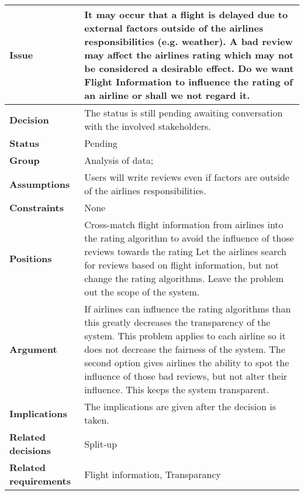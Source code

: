 
\label{dd:flight-inf}
\begin{tabular}{ l  p{10cm}}
\hline
\bf Issue & It may occur that a flight is delayed due to external factors outside of the airlines responsibilities (e.g. weather). A bad review may affect the airlines rating which may not be considered a desirable effect. Do we want Flight Information to influence the rating of an airline or shall we not regard it. \\
\hline
\bf Decision & The status is still pending awaiting conversation with the involved stakeholders. \\
\hline
\bf Status & Pending \\
\hline
\bf Group & Analysis of data; \\
\hline
\bf Assumptions & Users will write reviews even if factors are outside of the airlines responsibilities. \\
\hline
\bf Constraints & None \\
\hline
\bf Positions & Cross-match flight information from airlines into the rating algorithm to avoid the influence of those reviews towards the rating \newline\newline
Let the airlines search for reviews based on flight information, but not change the rating algorithms. \newline\newline
Leave the problem out the scope of the system. \\
\hline
\bf Argument & If airlines can influence the rating algorithms than this greatly decreases the transparency of the system. This problem applies to each airline so it does not decrease the fairness of the system. The second option gives airlines the ability to spot the influence of those bad reviews, but not alter their influence. This keeps the system transparent. \\
\hline
\bf Implications &The implications are given after the decision is taken. \\
\hline
\bf Related decisions & Split-up \\
\hline
\bf Related requirements  & Flight information, Transparancy \\
\hline
\end{tabular}
